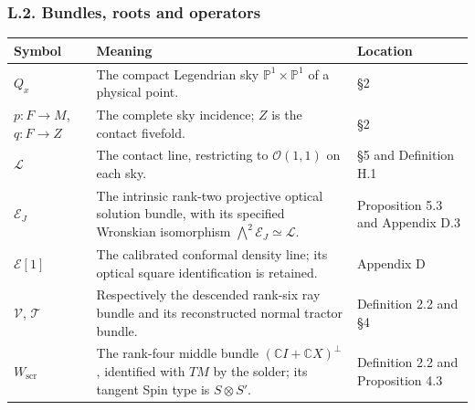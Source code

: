 \documentclass[
  english,
  11pt,
  reqno]{amsart}
\newcounter{none} %
\begin{document}
\protect{}\label{sec:gg-notation-bundles}

\subsubsection{L.2. Bundles, roots and
operators}\label{l.2.-bundles-roots-and-operators}

{\def\LTcaptype{none} %
\begin{longtable}[]{@{}
  >{\raggedright\arraybackslash}p{}
  >{\raggedright\arraybackslash}p{}
  >{\raggedright\arraybackslash}p{}@{}}
\toprule\noalign{}
\begin{minipage}[b]{\linewidth}\raggedright
Symbol
\end{minipage} & \begin{minipage}[b]{\linewidth}\raggedright
Meaning
\end{minipage} & \begin{minipage}[b]{\linewidth}\raggedright
Location
\end{minipage} \\
\midrule\noalign{}
\endhead
\bottomrule\noalign{}
\endlastfoot
\(Q_x\) & The compact Legendrian sky \(\mathbb P^1\times\mathbb P^1\) of
a physical point. & §2 \\
\(p:F\to M\), \(q:F\to Z\) & The complete sky incidence; \(Z\) is the
contact fivefold. & §2 \\
\(\mathcal L\) & The contact line, restricting to \(\mathcal O(1,1)\) on
each sky. & §5 and Definition H.1 \\
\(\mathcal E_J\) & The intrinsic rank-two projective optical solution
bundle, with its specified Wronskian isomorphism
\(\bigwedge^2\mathcal E_J\simeq\mathcal L\). & Proposition 5.3 and
Appendix D.3 \\
\(\mathcal E[1]\) & The calibrated conformal density line; its optical
square identification is retained. & Appendix D \\
\(\mathcal V\), \(\mathcal T\) & Respectively the descended rank-six ray
bundle and its reconstructed normal tractor bundle. & Definition 2.2 and
§4 \\
\(W_{\mathrm{scr}}\) & The rank-four middle bundle
\((\mathbb CI+\mathbb CX)^\perp\), identified with \(TM\) by the solder;
its tangent Spin type is \(S\otimes S'\). & Definition 2.2 and
Proposition 4.3 \\

\end{longtable}}
\end{document}
